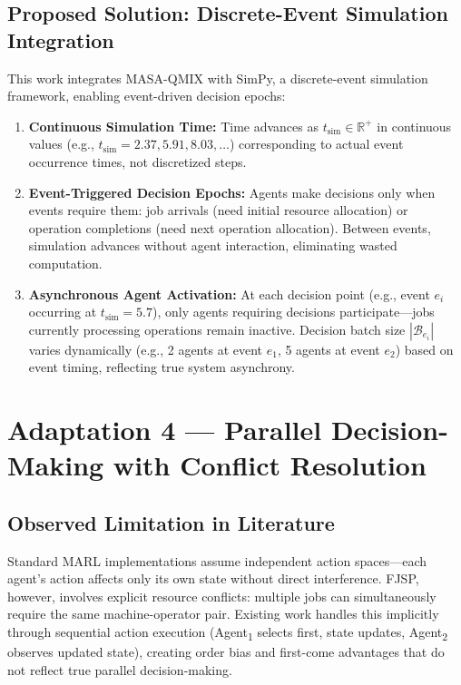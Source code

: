 \subsection{Proposed Solution: Discrete-Event Simulation Integration}

This work integrates MASA-QMIX with SimPy, a discrete-event simulation framework, enabling event-driven decision epochs:

\begin{enumerate}
\item \textbf{Continuous Simulation Time:} Time advances as \( t_{\text{sim}} \in \mathbb{R}^+ \) in continuous values (e.g., \( t_{\text{sim}} = 2.37, 5.91, 8.03, \ldots \)) corresponding to actual event occurrence times, not discretized steps.

\item \textbf{Event-Triggered Decision Epochs:} Agents make decisions only when events require them: job arrivals (need initial resource allocation) or operation completions (need next operation allocation). Between events, simulation advances without agent interaction, eliminating wasted computation.

\item \textbf{Asynchronous Agent Activation:} At each decision point (e.g., event \( e_i \) occurring at \( t_{\text{sim}} = 5.7 \)), only agents requiring decisions participate—jobs currently processing operations remain inactive. Decision batch size \( |\mathcal{B}_{e_i}| \) varies dynamically (e.g., 2 agents at event \( e_1 \), 5 agents at event \( e_2 \)) based on event timing, reflecting true system asynchrony.
\end{enumerate}


\section{Adaptation 4 — Parallel Decision-Making with Conflict Resolution}
\label{sec:conflict_adaptation}

\subsection{Observed Limitation in Literature}

Standard MARL implementations assume independent action spaces—each agent's action affects only its own state without direct interference. FJSP, however, involves explicit resource conflicts: multiple jobs can simultaneously require the same machine-operator pair. Existing work handles this implicitly through sequential action execution (Agent\textsubscript{1} selects first, state updates, Agent\textsubscript{2} observes updated state), creating order bias and first-come advantages that do not reflect true parallel decision-making.

